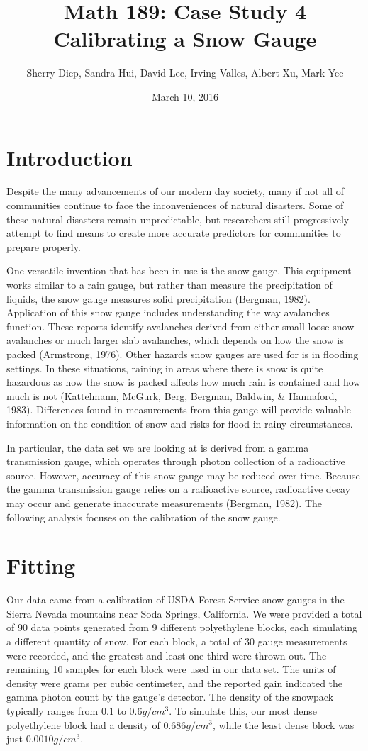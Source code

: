 \documentclass[11pt]{article} %
\title{\textbf{Math 189: Case Study 4}\\Calibrating a Snow Gauge}
\author{Sherry Diep, Sandra Hui, David Lee, Irving Valles, Albert Xu, Mark Yee}
\date{March 10, 2016}
\begin{document}
\maketitle

\section*{Introduction}
Despite the many advancements of our modern day society, many if not all of communities continue to face the inconveniences of natural disasters. Some of these natural disasters remain unpredictable, but researchers still progressively attempt to find means to create more accurate predictors for communities to prepare properly.

One versatile invention that has been in use is the snow gauge. This equipment works similar to a rain gauge, but rather than measure the precipitation of liquids, the snow gauge measures solid precipitation (Bergman, 1982). Application of this snow gauge includes understanding the way avalanches function. These reports identify avalanches derived from either small loose-snow avalanches or much larger slab avalanches, which depends on how the snow is packed (Armstrong, 1976). Other hazards snow gauges are used for is in flooding settings. In these situations, raining in areas where there is snow is quite hazardous as how the snow is packed affects how much rain is contained and how much is not (Kattelmann, McGurk, Berg, Bergman, Baldwin, \& Hannaford, 1983). Differences found in measurements from this gauge will provide valuable information on the condition of snow and risks for flood in rainy circumstances.

In particular, the data set we are looking at is derived from a gamma transmission gauge, which operates through photon collection of a radioactive source. However, accuracy of this snow gauge may be reduced over time. Because the gamma transmission gauge relies on a radioactive source, radioactive decay may occur and generate inaccurate measurements (Bergman, 1982). The following analysis focuses on the calibration of the snow gauge.

\section*{Fitting}
Our data came from a calibration of USDA Forest Service snow gauges in the Sierra Nevada mountains near Soda Springs, California. We were provided a total of 90 data points generated from 9 different polyethylene blocks, each simulating a different quantity of snow. For each block, a total of 30 gauge measurements were recorded, and the greatest and least one third were thrown out. The remaining 10 samples for each block were used in our data set. The units of density were grams per cubic centimeter, and the reported gain indicated the gamma photon count by the gauge’s detector. The density of the snowpack typically ranges from 0.1 to $0.6 g/cm^3$. To simulate this, our most dense polyethylene block had a density of $0.686 g/cm^3$, while the least dense block was just $0.0010 g/cm^3$.
\end{document}
